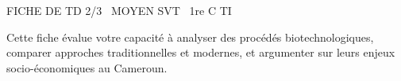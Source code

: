 \documentclass[11pt]{article}
\begin{document}
\begin{tcolorbox}[enhanced,colback=popink,colframe=popink,arc=10pt,boxrule=0pt,left=12pt,right=12pt,top=9pt,bottom=9pt]
{\color{white}\popxbold\small FICHE DE TD 2/3 \textbullet\ MOYEN \hfill SVT \textbullet\ 1re C TI\par}
\end{tcolorbox}
\vspace{4pt}
Cette fiche évalue votre capacité à analyser des procédés biotechnologiques, comparer approches traditionnelles et modernes, et argumenter sur leurs enjeux socio-économiques au Cameroun.
\end{document}
